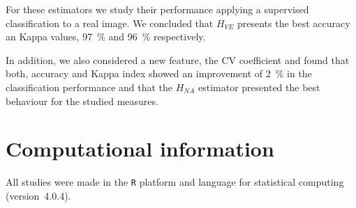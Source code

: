 \documentclass[journal]{IEEEtran}
\begin{document}
For these estimators we study their performance applying a supervised classification to a real image. We concluded that $H_{VE}$ presents the best accuracy an Kappa values, \SI{97}{\percent} and \SI{96}{\percent} respectively. 

In addition, we also considered a new feature, the CV coefficient and found that both,  accuracy and Kappa index showed an improvement  of \SI{2}{\percent} in the classification performance and that the $H_{NA}$ estimator presented the best behaviour for the studied measures.

\section{Computational information}
\label{conclusion}
	
All studies were made in the \texttt R platform and language for statistical computing~\cite{RLanguage} (version~4.0.4).
	
	


	
\end{document}
